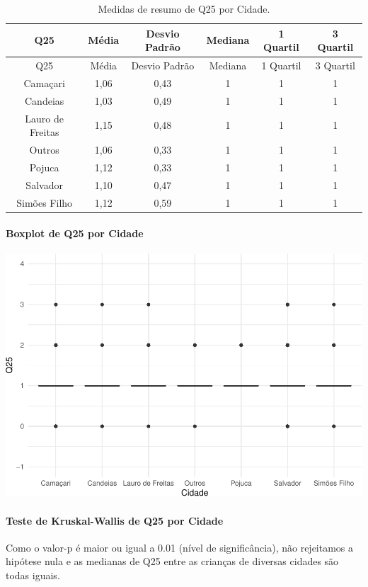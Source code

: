 \documentclass[]{article}
\let\oldparagraph\paragraph
\renewcommand{\paragraph}[1]{\oldparagraph{#1}\mbox{}}
\begin{document}
\begin{longtable}[]{@{}cccccc@{}}
\caption{\label{tab:unnamed-chunk-666}Medidas de resumo de Q25 por Cidade.}\tabularnewline
\toprule
Q25 & Média & Desvio Padrão & Mediana & 1 Quartil & 3 Quartil\tabularnewline
\midrule
\endfirsthead
\toprule
Q25 & Média & Desvio Padrão & Mediana & 1 Quartil & 3 Quartil\tabularnewline
\midrule
\endhead
Camaçari & 1,06 & 0,43 & 1 & 1 & 1\tabularnewline
Candeias & 1,03 & 0,49 & 1 & 1 & 1\tabularnewline
Lauro de Freitas & 1,15 & 0,48 & 1 & 1 & 1\tabularnewline
Outros & 1,06 & 0,33 & 1 & 1 & 1\tabularnewline
Pojuca & 1,12 & 0,33 & 1 & 1 & 1\tabularnewline
Salvador & 1,10 & 0,47 & 1 & 1 & 1\tabularnewline
Simões Filho & 1,12 & 0,59 & 1 & 1 & 1\tabularnewline
\bottomrule
\end{longtable}

\hypertarget{boxplot-de-q25-por-cidade}{%
\paragraph{Boxplot de Q25 por Cidade}\label{boxplot-de-q25-por-cidade}}

\begin{center}\includegraphics[width=0.75\linewidth]{relatorio_covid19_files/figure-latex/unnamed-chunk-667-1} \end{center}

\hypertarget{teste-de-kruskal-wallis-de-q25-por-cidade}{%
\paragraph{Teste de Kruskal-Wallis de Q25 por Cidade}\label{teste-de-kruskal-wallis-de-q25-por-cidade}}

Como o valor-p é maior ou igual a 0.01 (nível de significância), não rejeitamos a hipótese nula e as medianas de Q25 entre as crianças de diversas cidades são todas iguais.
\end{document}
